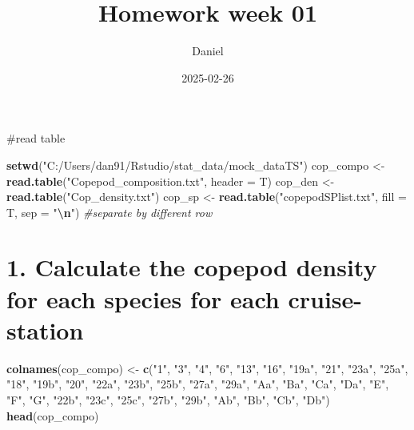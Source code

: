 \documentclass[
]{article}
\title{Homework week 01}
\author{Daniel}
\date{2025-02-26}
\newenvironment{Shaded}{\begin{snugshade}}{\end{snugshade}}
\newcommand{\AttributeTok}[1]{\textcolor[rgb]{0.13,0.29,0.53}{#1}}
\newcommand{\CommentTok}[1]{\textcolor[rgb]{0.56,0.35,0.01}{\textit{#1}}}
\newcommand{\FunctionTok}[1]{\textcolor[rgb]{0.13,0.29,0.53}{\textbf{#1}}}
\newcommand{\NormalTok}[1]{#1}
\newcommand{\OtherTok}[1]{\textcolor[rgb]{0.56,0.35,0.01}{#1}}
\newcommand{\SpecialCharTok}[1]{\textcolor[rgb]{0.81,0.36,0.00}{\textbf{#1}}}
\newcommand{\StringTok}[1]{\textcolor[rgb]{0.31,0.60,0.02}{#1}}
\begin{document}
\maketitle

\#read table

\begin{Shaded}
\begin{Highlighting}[]
\FunctionTok{setwd}\NormalTok{(}\StringTok{"C:/Users/dan91/Rstudio/stat\_data/mock\_dataTS"}\NormalTok{)}
\NormalTok{cop\_compo }\OtherTok{\textless{}{-}} \FunctionTok{read.table}\NormalTok{(}\StringTok{"Copepod\_composition.txt"}\NormalTok{, }\AttributeTok{header =}\NormalTok{ T)}
\NormalTok{cop\_den }\OtherTok{\textless{}{-}} \FunctionTok{read.table}\NormalTok{(}\StringTok{"Cop\_density.txt"}\NormalTok{)}
\NormalTok{cop\_sp }\OtherTok{\textless{}{-}} \FunctionTok{read.table}\NormalTok{(}\StringTok{"copepodSPlist.txt"}\NormalTok{, }\AttributeTok{fill =}\NormalTok{ T, }\AttributeTok{sep =} \StringTok{"}\SpecialCharTok{\textbackslash{}n}\StringTok{"}\NormalTok{) }\CommentTok{\#separate by different row}
\end{Highlighting}
\end{Shaded}

\section{1. Calculate the copepod density for each species for each
cruise-station}\label{calculate-the-copepod-density-for-each-species-for-each-cruise-station}

\begin{Shaded}
\begin{Highlighting}[]
\FunctionTok{colnames}\NormalTok{(cop\_compo) }\OtherTok{\textless{}{-}} \FunctionTok{c}\NormalTok{(}\StringTok{"1"}\NormalTok{, }\StringTok{"3"}\NormalTok{, }\StringTok{"4"}\NormalTok{, }\StringTok{"6"}\NormalTok{, }\StringTok{"13"}\NormalTok{, }\StringTok{"16"}\NormalTok{, }\StringTok{"19a"}\NormalTok{, }\StringTok{"21"}\NormalTok{, }\StringTok{"23a"}\NormalTok{, }\StringTok{"25a"}\NormalTok{, }\StringTok{"18"}\NormalTok{, }\StringTok{"19b"}\NormalTok{, }\StringTok{"20"}\NormalTok{, }\StringTok{"22a"}\NormalTok{, }\StringTok{"23b"}\NormalTok{, }\StringTok{"25b"}\NormalTok{, }\StringTok{"27a"}\NormalTok{, }\StringTok{"29a"}\NormalTok{, }\StringTok{"Aa"}\NormalTok{, }\StringTok{"Ba"}\NormalTok{, }\StringTok{"Ca"}\NormalTok{, }\StringTok{"Da"}\NormalTok{, }\StringTok{"E"}\NormalTok{, }\StringTok{"F"}\NormalTok{, }\StringTok{"G"}\NormalTok{, }\StringTok{"22b"}\NormalTok{, }\StringTok{"23c"}\NormalTok{, }\StringTok{"25c"}\NormalTok{, }\StringTok{"27b"}\NormalTok{, }\StringTok{"29b"}\NormalTok{, }\StringTok{"Ab"}\NormalTok{, }\StringTok{"Bb"}\NormalTok{, }\StringTok{"Cb"}\NormalTok{, }\StringTok{"Db"}\NormalTok{)}
\FunctionTok{head}\NormalTok{(cop\_compo)}
\end{Highlighting}
\end{Shaded}
\end{document}
